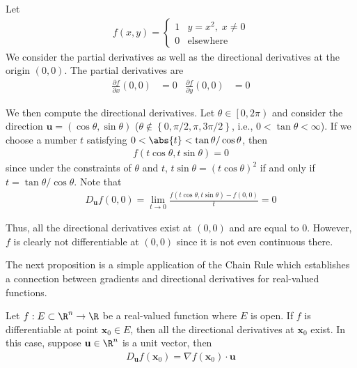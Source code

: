 \documentclass[thmcnt=section, 12pt]{elegantbook}
\begin{document}
\begin{example}
    Let
    \begin{align*}
        f(x, y) = \begin{cases}
            1 &y = x^2, \; x \neq 0 \\ 
            0 &\text{elsewhere}
        \end{cases}
    \end{align*}
    We consider the partial derivatives as well as the directional derivatives at the origin $(0,0)$. The partial derivatives are 
    \begin{align*}
        \frac{\partial f}{\partial x}(0,0)
        &= 0 & 
        \frac{\partial f}{\partial y}(0,0)
        &= 0
    \end{align*}
    
    \par We then compute the directional derivatives. Let $\theta \in \left[0, 2\pi\right)$ and consider the direction $\mathbf{u} = (\cos \theta, \sin \theta)$ ($\theta \notin \left\{0, \pi/2, \pi, 3\pi/2\right\}$, i.e., $0 < \tan \theta < \infty$). If we choose a number $t$ satisfying $0 < \abs{t} < \tan \theta / \cos\theta$, then 
    \begin{align*}
        f(t\cos \theta, t\sin \theta) = 0
    \end{align*}
    since under the constraints of $\theta$ and $t$, $t\sin \theta = (t\cos \theta)^2$ if and only if $t = \tan\theta / \cos\theta$. Note that 
    \begin{align*}
        D_{\mathbf{u}}f (0,0)
        = \lim_{t \to 0} \frac{f(t\cos\theta, t\sin\theta) - f(0,0)}{t}
        = 0
    \end{align*}

    \par Thus, all the directional derivatives exist at $(0,0)$ and are equal to $0$. However, $f$ is clearly not differentiable at $(0,0)$ since it is not even continuous there.
\end{example}


\par The next proposition is a simple application of the Chain Rule which establishes a connection between gradients and directional derivatives for real-valued functions. 

\begin{proposition}
    Let $f: E \subset \R^n \to \R$ be a real-valued function where $E$ is open.
    If $f$ is differentiable at point $\mathbf{x}_0 \in E$, then all the directional derivatives at $\mathbf{x}_0$ exist. In this case, suppose $\mathbf{u} \in \R^n$ is a unit vector, then 
    \begin{align}
        D_{\mathbf{u}}f (\mathbf{x}_0)
        = \nabla f (\mathbf{x}_0) \cdot \mathbf{u}
        \label{eq:47}
    \end{align}
\end{proposition}
\end{document}
